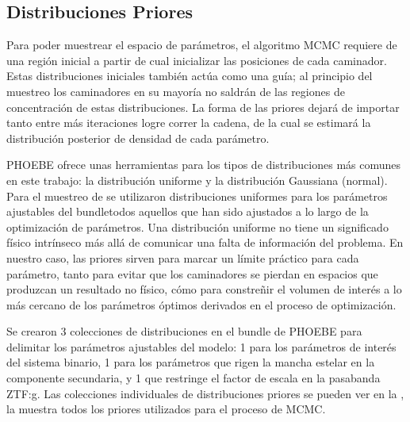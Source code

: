 \subsection{Distribuciones Priores}

Para poder muestrear el espacio de parámetros, el algoritmo MCMC requiere de una
región inicial a partir de cual inicializar las posiciones de cada caminador.
Estas distribuciones iniciales también actúa como una guía; al principio del
muestreo los caminadores en su mayoría no saldrán de las regiones de
concentración de estas distribuciones. La forma de las priores dejará de
importar tanto entre más iteraciones logre correr la cadena, de la cual se
estimará la distribución posterior de densidad de cada parámetro.

PHOEBE ofrece unas herramientas para los tipos de distribuciones más comunes en
este trabajo: la distribución uniforme y la distribución Gaussiana (normal).
Para el muestreo de \atoObjId se utilizaron distribuciones uniformes para los
parámetros ajustables del bundle\textemdash todos aquellos que han sido
ajustados a lo largo de la optimización de parámetros. Una distribución uniforme
no tiene un significado físico intrínseco más allá de comunicar una falta de
información del problema. En nuestro caso, las priores sirven para marcar un
límite práctico para cada parámetro, tanto para evitar que los caminadores se
pierdan en espacios que produzcan un resultado no físico, cómo para constreñir
el volumen de interés a lo más cercano de los parámetros óptimos derivados en el
proceso de optimización. 

Se crearon 3 colecciones de distribuciones en el bundle de PHOEBE para delimitar
los parámetros ajustables del modelo: 1 para los parámetros de interés del
sistema binario, 1 para los parámetros que rigen la mancha estelar en la
componente secundaria, y 1 que restringe el factor de escala en la pasabanda
ZTF:g. Las colecciones individuales de distribuciones priores se pueden ver en
la , la
muestra todos los priores utilizados para el proceso de MCMC.

